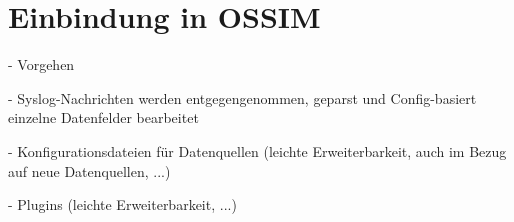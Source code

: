 \section{Einbindung in OSSIM}

\label{sec_impl_integration_into_ossim}

- Vorgehen

- Syslog-Nachrichten werden entgegengenommen, geparst und Config-basiert einzelne Datenfelder bearbeitet

- Konfigurationsdateien für Datenquellen (leichte Erweiterbarkeit, auch im Bezug auf neue Datenquellen, ...)

- Plugins (leichte Erweiterbarkeit, ...)